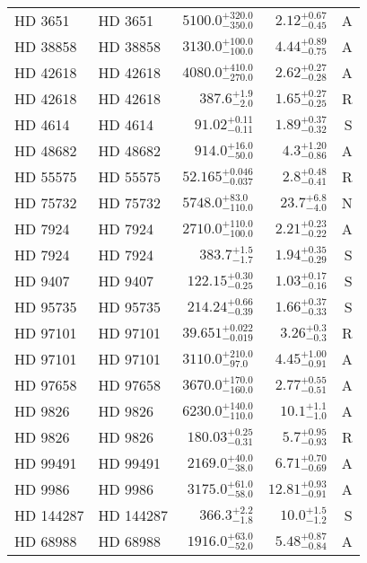 \begin{longtable*}{llrrr}
HD 3651 & HD 3651 & $5100.0^{+320.0}_{-350.0}$ & $2.12^{+0.67}_{-0.45}$ & A \\
HD 38858 & HD 38858 & $3130.0^{+100.0}_{-100.0}$ & $4.44^{+0.89}_{-0.75}$ & A \\
HD 42618 & HD 42618 & $4080.0^{+410.0}_{-270.0}$ & $2.62^{+0.27}_{-0.28}$ & A \\
HD 42618 & HD 42618 & $387.6^{+1.9}_{-2.0}$ & $1.65^{+0.27}_{-0.25}$ & R \\
HD 4614 & HD 4614 & $91.02^{+0.11}_{-0.11}$ & $1.89^{+0.37}_{-0.32}$ & S \\
HD 48682 & HD 48682 & $914.0^{+16.0}_{-50.0}$ & $4.3^{+1.20}_{-0.86}$ & A \\
HD 55575 & HD 55575 & $52.165^{+0.046}_{-0.037}$ & $2.8^{+0.48}_{-0.41}$ & R \\
HD 75732 & HD 75732 & $5748.0^{+83.0}_{-110.0}$ & $23.7^{+6.8}_{-4.0}$ & N \\
HD 7924 & HD 7924 & $2710.0^{+110.0}_{-100.0}$ & $2.21^{+0.23}_{-0.22}$ & A \\
HD 7924 & HD 7924 & $383.7^{+1.5}_{-1.7}$ & $1.94^{+0.35}_{-0.29}$ & S \\
HD 9407 & HD 9407 & $122.15^{+0.30}_{-0.25}$ & $1.03^{+0.17}_{-0.16}$ & S \\
HD 95735 & HD 95735 & $214.24^{+0.66}_{-0.39}$ & $1.66^{+0.37}_{-0.33}$ & S \\
HD 97101 & HD 97101 & $39.651^{+0.022}_{-0.019}$ & $3.26^{+0.3}_{-0.3}$ & R \\
HD 97101 & HD 97101 & $3110.0^{+210.0}_{-97.0}$ & $4.45^{+1.00}_{-0.91}$ & A \\
HD 97658 & HD 97658 & $3670.0^{+170.0}_{-160.0}$ & $2.77^{+0.55}_{-0.51}$ & A \\
HD 9826 & HD 9826 & $6230.0^{+140.0}_{-110.0}$ & $10.1^{+1.1}_{-1.0}$ & A \\
HD 9826 & HD 9826 & $180.03^{+0.25}_{-0.31}$ & $5.7^{+0.95}_{-0.93}$ & R \\
HD 99491 & HD 99491 & $2169.0^{+40.0}_{-38.0}$ & $6.71^{+0.70}_{-0.69}$ & A \\
HD 9986 & HD 9986 & $3175.0^{+61.0}_{-58.0}$ & $12.81^{+0.93}_{-0.91}$ & A \\
HD 144287 & HD 144287 & $366.3^{+2.2}_{-1.8}$ & $10.0^{+1.5}_{-1.2}$ & S \\
HD 68988 & HD 68988 & $1916.0^{+63.0}_{-52.0}$ & $5.48^{+0.87}_{-0.84}$ & A \\
\bottomrule
\end{longtable*}
